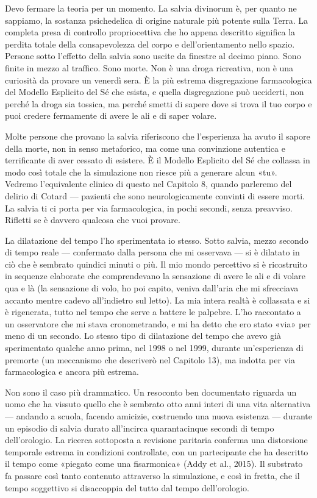 \documentclass[11pt, twoside, openright]{book}
\begin{document}
Devo fermare la teoria per un momento. La salvia divinorum è, per quanto ne sappiamo, la sostanza psichedelica di origine naturale più potente sulla Terra. La completa presa di controllo propriocettiva che ho appena descritto significa la perdita totale della consapevolezza del corpo e dell'orientamento nello spazio. Persone sotto l'effetto della salvia sono uscite da finestre al decimo piano. Sono finite in mezzo al traffico. Sono morte. Non è una droga ricreativa, non è una curiosità da provare un venerdì sera. È la più estrema disgregazione farmacologica del Modello Esplicito del Sé che esista, e quella disgregazione può ucciderti, non perché la droga sia tossica, ma perché smetti di sapere dove si trova il tuo corpo e puoi credere fermamente di avere le ali e di saper volare.

Molte persone che provano la salvia riferiscono che l'esperienza ha avuto il sapore della morte, non in senso metaforico, ma come una convinzione autentica e terrificante di aver cessato di esistere. È il Modello Esplicito del Sé che collassa in modo così totale che la simulazione non riesce più a generare alcun «tu». Vedremo l'equivalente clinico di questo nel Capitolo 8, quando parleremo del delirio di Cotard --- pazienti che sono neurologicamente convinti di essere morti. La salvia ti ci porta per via farmacologica, in pochi secondi, senza preavviso. Rifletti se è davvero qualcosa che vuoi provare.

La dilatazione del tempo l'ho sperimentata io stesso. Sotto salvia, mezzo secondo di tempo reale --- confermato dalla persona che mi osservava --- si è dilatato in ciò che è sembrato quindici minuti o più. Il mio mondo percettivo si è ricostruito in sequenze elaborate che comprendevano la sensazione di avere le ali e di volare qua e là (la sensazione di volo, ho poi capito, veniva dall'aria che mi sfrecciava accanto mentre cadevo all'indietro sul letto). La mia intera realtà è collassata e si è rigenerata, tutto nel tempo che serve a battere le palpebre. L'ho raccontato a un osservatore che mi stava cronometrando, e mi ha detto che ero stato «via» per meno di un secondo. Lo stesso tipo di dilatazione del tempo che avevo già sperimentato qualche anno prima, nel 1998 o nel 1999, durante un'esperienza di premorte (un meccanismo che descriverò nel Capitolo 13), ma indotta per via farmacologica e ancora più estrema.

Non sono il caso più drammatico. Un resoconto ben documentato riguarda un uomo che ha vissuto quello che è sembrato otto anni interi di una vita alternativa --- andando a scuola, facendo amicizie, costruendo una nuova esistenza --- durante un episodio di salvia durato all'incirca quarantacinque secondi di tempo dell'orologio. La ricerca sottoposta a revisione paritaria conferma una distorsione temporale estrema in condizioni controllate, con un partecipante che ha descritto il tempo come «piegato come una fisarmonica» (Addy et al., 2015). Il substrato fa passare così tanto contenuto attraverso la simulazione, e così in fretta, che il tempo soggettivo si disaccoppia del tutto dal tempo dell'orologio.
\end{document}
